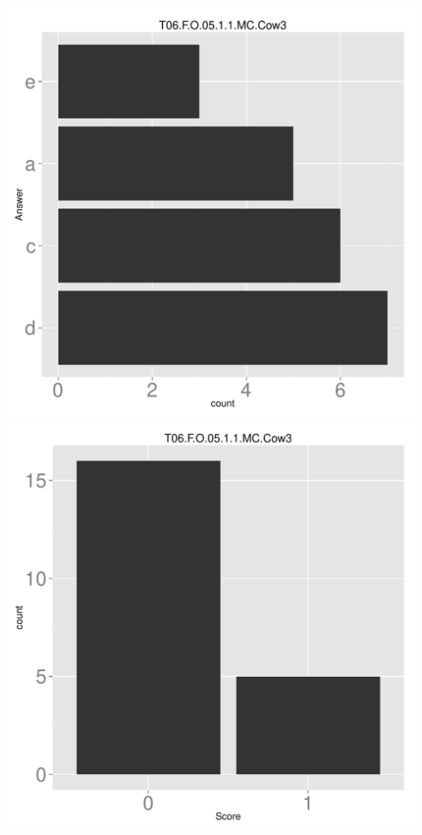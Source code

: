 \documentclass[12pt,nohyper]{tufte-handout}\usepackage[]{graphicx}\usepackage[]{color}
\begin{document}
\begin{center} \includegraphics[width=.45\linewidth]{Topic06_59_answer} \includegraphics[width=.45\linewidth]{Topic06_59_score} \end{center} 
\end{document}
